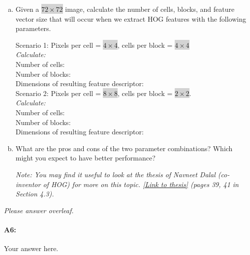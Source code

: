 \begin{enumerate}[(a)]
    \item Given a \colorbox{lightgray}{$72\times72$} image, calculate the number of cells, blocks, and feature vector size that will occur when we extract HOG features with the following parameters.

          Scenario 1: Pixels per cell = \colorbox{lightgray}{$4\times4$}, cells per block = \colorbox{lightgray}{$4\times4$} %
          \\
          \emph{Calculate:}
          \\
          Number of cells:
          \\
          Number of blocks:
          \\
          Dimensions of resulting feature descriptor:
          \\

          Scenario 2: Pixels per cell = \colorbox{lightgray}{$8\times8$}, cells per block = \colorbox{lightgray}{$2\times2$}.
          \\
          \emph{Calculate:}
          \\
          Number of cells:
          \\
          Number of blocks:
          \\
          Dimensions of resulting feature descriptor:


    \item What are the pros and cons of the two parameter combinations? Which might you expect to have better performance?

          \emph{Note: You may find it useful to look at the thesis of Navneet Dalal (co-inventor of HOG) for more on this topic. \href{http://lear.inrialpes.fr/people/dalal/NavneetDalalThesis.pdf}{[Link to thesis]} (pages 39, 41 in Section 4.3).}

\end{enumerate}

\emph{Please answer overleaf.}


\pagebreak
\paragraph{A6:} Your answer here.

